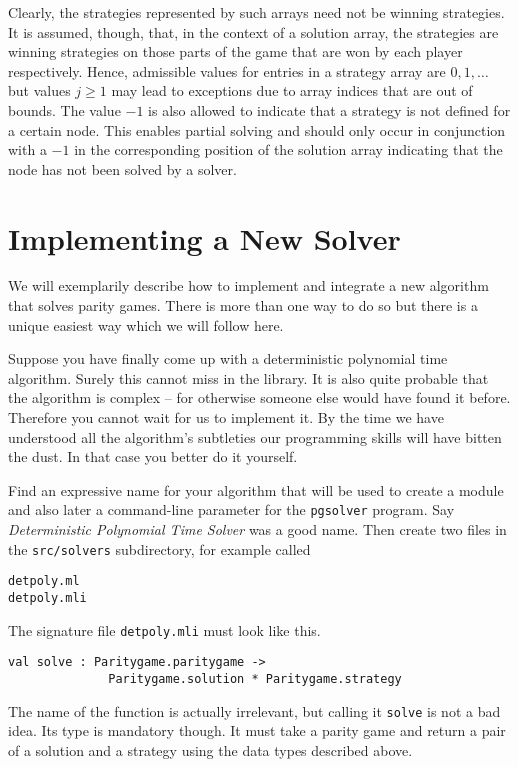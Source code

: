 Clearly, the strategies represented by such arrays need not be winning strategies. It is assumed, though,
that, in the context of a solution array, the strategies are winning strategies on those parts of the game
that are won by each player respectively. Hence, admissible values for entries in a strategy array
are $0,1,\ldots$ but values $j \ge 1$ may lead to exceptions due to array indices that are out of bounds.
The value $-1$ is also allowed to indicate that a strategy is not defined for a certain node. This enables
partial solving and should only occur in conjunction with a $-1$ in the corresponding position of the
solution array indicating that the node has not been solved by a solver.

\section{Implementing a New Solver}

We will exemplarily describe how to implement and integrate a new algorithm that solves parity games. There
is more than one way to do so but there is a unique easiest way which we will follow here.

Suppose you have finally come up with a deterministic polynomial time algorithm. Surely this cannot miss in
the \pgsolver library. It is also quite probable that the algorithm is complex -- for otherwise someone
else would have found it before. Therefore you cannot wait for us to implement it. By the time we have
understood all the algorithm's subtleties our programming skills will have bitten the dust. In that case you
better do it yourself.

Find an expressive name for your algorithm that will be used to create a module and also later a command-line
parameter for the \texttt{pgsolver} program. Say \emph{Deterministic Polynomial Time Solver} was a good name.
Then create two files in the \texttt{src/solvers} subdirectory, for example called
\begin{verbatim}
detpoly.ml
detpoly.mli
\end{verbatim}
The signature file \texttt{detpoly.mli} must look like this.
\begin{verbatim}
val solve : Paritygame.paritygame ->
              Paritygame.solution * Paritygame.strategy
\end{verbatim}
The name of the function is actually irrelevant, but calling it \texttt{solve} is not a bad idea. Its type
is mandatory though. It must take a parity game and return a pair of a solution and a strategy using the
data types described above.

